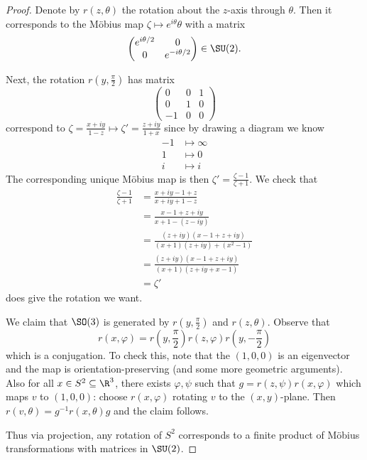 \documentclass[a4paper]{article}
\begin{document}
\begin{proof}
  Denote by \(r(z, \theta)\) the rotation about the \(z\)-axis through \(\theta\). Then it corresponds to the Möbius map \(\zeta \mapsto e^{i\theta} \theta\) with a matrix
  \[
    \begin{pmatrix}
      e^{i\theta/2} & 0 \\
      0 & e^{-i\theta/2}
    \end{pmatrix}
    \in \SU(2).
  \]

  Next, the rotation \(r(y, \frac{\pi}{2})\) has matrix
  \[
    \begin{pmatrix}
      0 & 0 & 1 \\
      0 & 1 & 0 \\
      -1 & 0 & 0
    \end{pmatrix}
  \]
  correspond to \(\zeta = \frac{x + iy}{1 - z} \mapsto \zeta' = \frac{z + iy}{1 + x}\) since by drawing a diagram we know
  \begin{align*}
    -1 &\mapsto \infty \\
    1 &\mapsto 0 \\
    i &\mapsto i
  \end{align*}
  The corresponding unique Möbius map is then \(\zeta' = \frac{\zeta - 1}{\zeta + 1}\). We check that
  \begin{align*}
    \frac{\zeta - 1}{\zeta + 1}
    &= \frac{x + iy - 1 + z}{x + iy +1 - z} \\
    &= \frac{x - 1 + z + iy}{x + 1 - (z - iy)} \\
    &= \frac{(z + iy)(x - 1 + z + iy)}{(x + 1)(z + iy) + (x^2 - 1)} \\
    &= \frac{(z + iy)(x - 1 + z + iy)}{(x + 1)(z + iy + x -1)} \\
    &= \zeta'
  \end{align*}
  does give the rotation we want.

  We claim that \(\SO(3)\) is generated by \(r(y, \frac{\pi}{2})\) and \(r(z, \theta)\). Observe that
  \[
    r(x, \varphi) = r(y, \frac{\pi}{2}) r(z, \varphi) r(y, -\frac{\pi}{2})
  \]
  which is a conjugation. To check this, note that the \((1, 0, 0)\) is an eigenvector and the map is orientation-preserving (and some more geometric arguments). Also for all \(x \in S^2 \subseteq \R^3\), there exists \(\varphi, \psi\) such that \(g =r(z, \psi) r(x, \varphi)\) which maps \(v\) to \((1, 0, 0)\): choose \(r(x, \varphi)\) rotating \(v\) to the \((x, y)\)-plane. Then \(r(v, \theta) = g^{-1} r(x, \theta) g\) and the claim follows.

  Thus via projection, any rotation of \(S^2\) corresponds to a finite product of Möbius transformations with matrices in \(\SU(2)\).
\end{proof}
\end{document}
